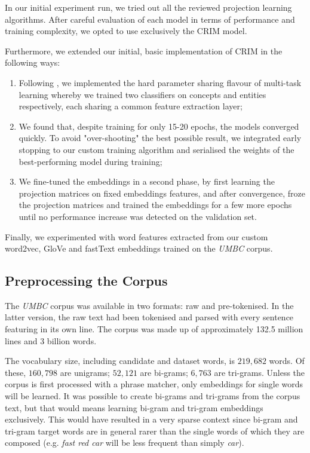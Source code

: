 In our initial experiment run, we tried out all the reviewed projection learning algorithms.  After careful evaluation of each model in terms of performance and training complexity, we opted to use exclusively the CRIM model.  %

Furthermore, we extended our initial, basic implementation of CRIM in the following ways:
\begin{enumerate}
    \item Following \citep{bernier2018crim}, we implemented the hard parameter sharing flavour of multi-task learning \citep{ruder2017overview} whereby we trained two classifiers on concepts and entities respectively, each sharing a common feature extraction layer;
    \item We found that, despite training for only 15-20 epochs, the models converged quickly. To avoid "over-shooting" the best possible result, we integrated early stopping to our custom training algorithm and serialised the weights of the best-performing model during training;
    \item We fine-tuned the embeddings in a second phase, by first learning the projection matrices on fixed embeddings features, and after convergence, froze the projection matrices and trained the embeddings for a few more epochs until no performance increase was detected on the validation set.
\end{enumerate}

Finally, we experimented with word features extracted from our custom word2vec, GloVe and fastText embeddings trained on the \textit{UMBC} corpus.  

\subsection{Preprocessing the Corpus} \label{semeval_preprocessing}
The \textit{UMBC} corpus was available in two formats: raw and pre-tokenised.  In the latter version, the raw text had been tokenised and parsed with every sentence featuring in its own line.  The corpus was made up of approximately 132.5 million lines and 3 billion words. 

The vocabulary size, including candidate and dataset words, is $219,682$ words.  Of these, $160,798$ are unigrams; $52,121$ are bi-grams; $6,763$ are tri-grams.  Unless the corpus is first processed with a phrase matcher, only embeddings for single words will be learned.  It was possible to create bi-grams and tri-grams from the corpus text, but that would means learning bi-gram and tri-gram embeddings exclusively.  This would have resulted in a very sparse context since bi-gram and tri-gram target words are in general rarer than the single words of which they are composed (e.g. \textit{fast red car} will be less frequent than simply \textit{car}).  

